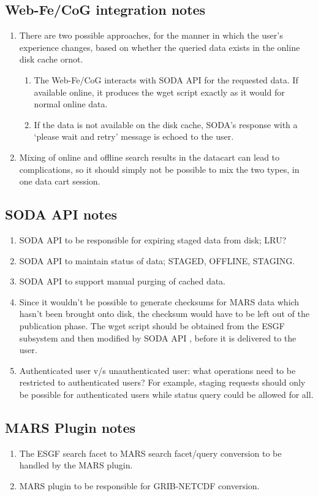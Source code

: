\documentclass[oneside,12pt]{memoir}
\def\phname{SODA API{ }}
\begin{document}
\subsection{Web-Fe/CoG integration notes}
\begin{enumerate}
\item There are two possible approaches, for the manner in which the user's experience changes, based on whether the queried data exists in the online disk cache ornot.
\begin{enumerate}
\item The Web-Fe/CoG interacts with \phname for the requested data. If available online, it produces the wget script exactly as it would for normal online data.
\item If the data is not available on the disk cache, SODA’s response with a `please wait and retry' message is echoed to the user.
\end{enumerate}
\item Mixing of online and offline search results in the datacart can lead to complications, so it should simply not be possible to mix the two types, in one data cart session.
\end{enumerate}
\subsection{\phname notes}
\begin{enumerate}
\item \phname to be responsible for expiring staged data from disk; LRU?
\item \phname to maintain status of data; STAGED, OFFLINE, STAGING.
\item \phname to support manual purging of cached data.
\item Since it wouldn't be possible to generate checksums for MARS data which hasn't been
brought onto disk, the checksum would have to be left out of the publication phase.
The wget script should be obtained from the ESGF subsystem and then modiﬁed by \phname, before it is delivered to the user.
\item Authenticated user v/s unauthenticated user: what operations need to be restricted to authenticated users? For example, staging requests should only be possible for authenticated users while status query could be allowed for all.
\end{enumerate}

\subsection{MARS Plugin notes}
\begin{enumerate}
\item The ESGF search facet to MARS search facet/query conversion to be handled by the MARS plugin.
\item MARS plugin to be responsible for GRIB-NETCDF conversion.
\end{enumerate}
\end{document}
